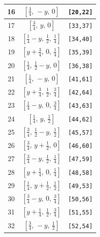 \documentclass[fleqn,8pt]{jsarticle}
\begin{document}
\begin{longtable}{ccc}
16 & $\left[ \frac{3}{4},\, - y,\, 0 \right]$ & {\tt [20,22]} \\ \hline
17 & $\left[ \frac{3}{4},\, y,\, 0 \right]$ & {\tt [33,37]} \\ \hline
18 & $\left[ \frac{1}{4} - y,\, \frac{1}{2},\, \frac{1}{4} \right]$ & {\tt [34,40]} \\ \hline
19 & $\left[ y + \frac{3}{4},\, 0,\, \frac{1}{4} \right]$ & {\tt [35,39]} \\ \hline
20 & $\left[ \frac{1}{4},\, \frac{1}{2} - y,\, 0 \right]$ & {\tt [36,38]} \\ \hline
21 & $\left[ \frac{1}{4},\, - y,\, 0 \right]$ & {\tt [41,61]} \\ \hline
22 & $\left[ y + \frac{3}{4},\, \frac{1}{2},\, \frac{3}{4} \right]$ & {\tt [42,64]} \\ \hline
23 & $\left[ \frac{1}{4} - y,\, 0,\, \frac{3}{4} \right]$ & {\tt [43,63]} \\ \hline
24 & $\left[ \frac{1}{4},\, y,\, \frac{1}{2} \right]$ & {\tt [44,62]} \\ \hline
25 & $\left[ \frac{3}{4},\, \frac{1}{2} - y,\, \frac{1}{2} \right]$ & {\tt [45,57]} \\ \hline
26 & $\left[ \frac{3}{4},\, y + \frac{1}{2},\, 0 \right]$ & {\tt [46,60]} \\ \hline
27 & $\left[ \frac{3}{4} - y,\, \frac{1}{2},\, \frac{1}{4} \right]$ & {\tt [47,59]} \\ \hline
28 & $\left[ y + \frac{1}{4},\, 0,\, \frac{1}{4} \right]$ & {\tt [48,58]} \\ \hline
29 & $\left[ \frac{1}{4},\, y + \frac{1}{2},\, \frac{1}{2} \right]$ & {\tt [49,53]} \\ \hline
30 & $\left[ \frac{3}{4} - y,\, 0,\, \frac{3}{4} \right]$ & {\tt [50,56]} \\ \hline
31 & $\left[ y + \frac{1}{4},\, \frac{1}{2},\, \frac{3}{4} \right]$ & {\tt [51,55]} \\ \hline
32 & $\left[ \frac{3}{4},\, - y,\, \frac{1}{2} \right]$ & {\tt [52,54]} \\
\end{longtable}
\renewcommand{\arraystretch}{1.2}
\end{document}
